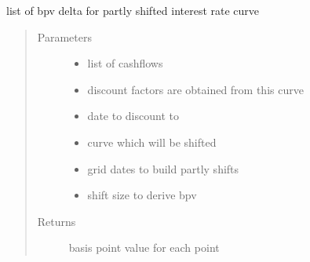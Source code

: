\documentclass[a4paper,10pt,english]{sphinxmanual}
\begin{document}
\begin{fulllineitems}
\label{\detokenize{api/Derivate:Derivate.session3_exercise3.get_bucketed_delta}}
\sphinxAtStartPar
list of bpv delta for partly shifted interest rate curve
\begin{quote}\begin{description}
\item[{Parameters}] \leavevmode\begin{itemize}
\item {} 
\sphinxAtStartPar
{} \textendash{} list of cashflows

\item {} 
\sphinxAtStartPar
{} \textendash{} discount factors are obtained from this curve

\item {} 
\sphinxAtStartPar
{} \textendash{} date to discount to

\item {} 
\sphinxAtStartPar
{} \textendash{} curve which will be shifted

\item {} 
\sphinxAtStartPar
{} \textendash{} grid dates to build partly shifts

\item {} 
\sphinxAtStartPar
{} \textendash{} shift size to derive bpv

\end{itemize}

\item[{Returns}] \leavevmode
\sphinxAtStartPar
{} \sphinxhyphen{} basis point value for each  point

\end{description}\end{quote}


\end{fulllineitems}
\end{document}
